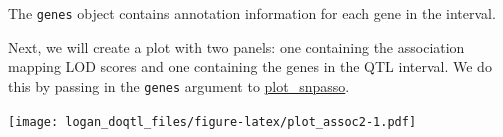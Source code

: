 \documentclass[]{article}
\begin{document}
The \texttt{genes} object contains annotation information for each gene
in the interval.

Next, we will create a plot with two panels: one containing the
association mapping LOD scores and one containing the genes in the QTL
interval. We do this by passing in the \texttt{genes} argument to
\href{https://github.com/rqtl/qtl2/blob/master/R/plot_snpasso.R}{plot\_snpasso}.

\texttt{[image: logan\_doqtl\_files/figure-latex/plot\_assoc2-1.pdf]}
\end{document}
